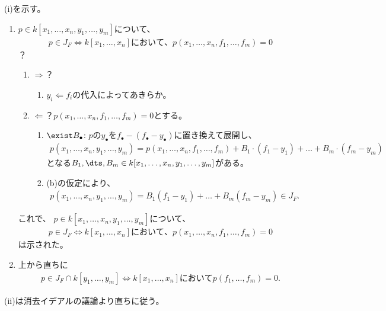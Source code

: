\begin{myproof}
  (i)を示す。
  \begin{enumerate}
    \item
    $p\in k[x_1,\dots,x_n,y_1,\dots,y_m]$について、
    \begin{align}
      p\in J_F \iff
      k[x_1,\dots,x_n] において、 p(x_1,\dots,x_n,f_1,\dots,f_m) = 0
    \end{align}？
    \begin{enumerate}
      \item $\Rightarrow$？
      \begin{enumerate}
        \item $y_i \Leftarrow f_i$の代入によってあきらか。
      \end{enumerate}
      \item $\Leftarrow$？$p(x_1,\dots,x_n,f_1,\dots,f_m) = 0$とする。
      \begin{enumerate}
        \item  $\exist B_\bullet$:
        $p$の$y_\bullet$を$f_\bullet -(f_\bullet - y_\bullet)$に置き換えて展開し、
        \begin{align}
          p(x_1,\dots,x_n,y_1,\dots,y_m)
          =
          p(x_1,\dots,x_n,f_1,\dots,f_m) + B_1\cdot (f_1-y_1) + \dots + B_m\cdot (f_m-y_m)
        \end{align}
        となる$B_1,\dts,B_m \in k[x_1,\dots,x_n,y_1,\dots,y_m]$がある。
        \item
        (b)の仮定により、
        \begin{align}
          p(x_1,\dots,x_n,y_1,\dots,y_m) = B_1(f_1-y_1) + \dots + B_m(f_m-y_m)\in J_F.
        \end{align}
      \end{enumerate}
    \end{enumerate}
    これで、
        $p\in k[x_1,\dots,x_n,y_1,\dots,y_m]$について、
    \begin{align}
      p\in J_F \iff
      k[x_1,\dots,x_n] において、 p(x_1,\dots,x_n,f_1,\dots,f_m) = 0
    \end{align}は示された。
    \item
    上から直ちに
    \begin{align}
      p\in J_F\cap k[y_1,\dots,y_m]
      \iff
      k[x_1,\dots,x_n] において p(f_1,\dots,f_m) = 0.
    \end{align}
  \end{enumerate}
  (ii)は消去イデアルの議論より直ちに従う。
\end{myproof}

